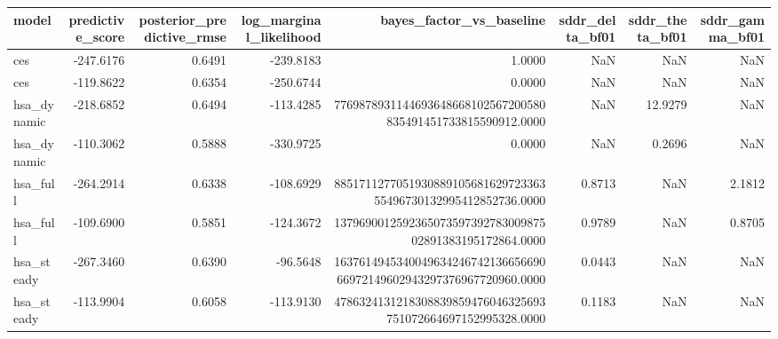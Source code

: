 \begin{tabular}{lrrrrrrr}
\toprule
model & predictive\_score & posterior\_predictive\_rmse & log\_marginal\_likelihood & bayes\_factor\_vs\_baseline & sddr\_delta\_bf01 & sddr\_theta\_bf01 & sddr\_gamma\_bf01 \\
\midrule
ces & -247.6176 & 0.6491 & -239.8183 & 1.0000 & NaN & NaN & NaN \\
ces & -119.8622 & 0.6354 & -250.6744 & 0.0000 & NaN & NaN & NaN \\
hsa\_dynamic & -218.6852 & 0.6494 & -113.4285 & 7769878931144693648668102567200580835491451733815590912.0000 & NaN & 12.9279 & NaN \\
hsa\_dynamic & -110.3062 & 0.5888 & -330.9725 & 0.0000 & NaN & 0.2696 & NaN \\
hsa\_full & -264.2914 & 0.6338 & -108.6929 & 885171127705193088910568162972336355496730132995412852736.0000 & 0.8713 & NaN & 2.1812 \\
hsa\_full & -109.6900 & 0.5851 & -124.3672 & 137969001259236507359739278300987502891383195172864.0000 & 0.9789 & NaN & 0.8705 \\
hsa\_steady & -267.3460 & 0.6390 & -96.5648 & 163761494534004963424674213665669066972149602943297376967720960.0000 & 0.0443 & NaN & NaN \\
hsa\_steady & -113.9904 & 0.6058 & -113.9130 & 4786324131218308839859476046325693751072664697152995328.0000 & 0.1183 & NaN & NaN \\
\bottomrule
\end{tabular}
